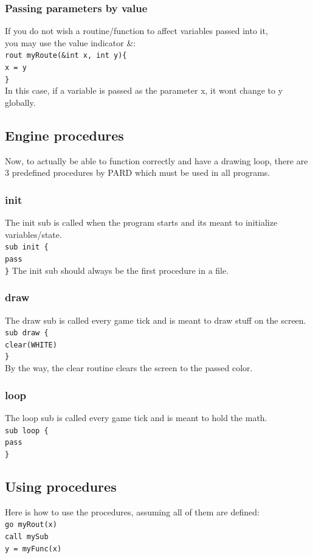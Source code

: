\documentclass[11pt,a4paper]{article}
\begin{document}
\subsubsection{Passing parameters by value}
If you do not wish a routine/function to affect variables passed into it, \\you may use the  value indicator \&: \\
\texttt{rout myRoute(\&int x, int y)\{  \\ x = y \\ \}  } \\
In this case, if a variable is passed as the parameter x, it wont change to y globally.
\subsection{Engine procedures}
Now, to actually be able to function correctly and have a drawing loop, there are 3 predefined procedures by PARD which must be used in all programs. \\
\subsubsection{init}
The init sub is called when the program starts and its meant to initialize variables/state. \\
\texttt{sub init \{\\ pass \\\}}
The init sub should always be the first procedure in a file.
\subsubsection{draw}
The draw sub is called every game tick and is meant to draw stuff on the screen. \\
\texttt{sub draw \{\\ clear(WHITE) \\\}} \\
By the way, the clear routine clears the screen to the passed color.
\subsubsection{loop}
The loop sub is called every game tick and is meant to hold the math. \\
\texttt{sub loop \{\\ pass \\\}}
\subsection{Using procedures}
Here is how to use the procedures, assuming all of them are defined: \\
\texttt{go myRout(x)} \\
\texttt{call mySub} \\
\texttt{y = myFunc(x)} \\
\end{document}
